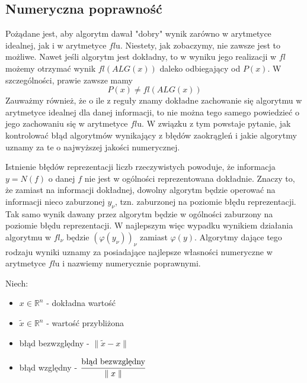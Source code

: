 \documentclass[hidelinks,a4paper,fleqn]{article}
\newcommand{\RR}{\mathbb{R}}
\begin{document}
\subsection{Numeryczna poprawność}

Pożądane jest, aby algorytm dawał "dobry" wynik zarówno w arytmetyce idealnej, jak i w arytmetyce $fl$u. Niestety, jak zobaczymy, nie zawsze jest to możliwe. Nawet jeśli algorytm jest dokładny, to w wyniku jego realizacji w $fl$ możemy otrzymać wynik $fl(ALG(x))$ daleko odbiegający od $P(x)$. W szczególności, prawie zawsze mamy
\[P(x) \neq fl(ALG(x))\]
Zauważmy również, że o ile z reguły znamy dokładne zachowanie się algorytmu w arytmetyce idealnej dla danej informacji, to nie można tego samego powiedzieć o jego zachowaniu się w arytmetyce $fl$u. W związku z tym powstaje pytanie, jak kontrolować błąd algorytmów wynikający z błędów zaokrągleń i jakie algorytmy uznamy za te o najwyższej jakości numerycznej.

Istnienie błędów reprezentacji liczb rzeczywistych powoduje, że informacja $y=N(f)$ o danej $f$ nie jest w ogólności reprezentowana dokładnie. Znaczy to, że zamiast na informacji dokładnej, dowolny algorytm będzie operować na informacji nieco zaburzonej $y_\nu$, tzn. zaburzonej na poziomie błędu reprezentacji. Tak samo wynik dawany przez algorytm będzie w ogólności zaburzony na poziomie błędu reprezentacji. W najlepszym więc wypadku wynikiem działania algorytmu w $fl_\nu$ będzie $(\varphi(y_\nu))_\nu$ zamiast $\varphi(y)$. Algorytmy dające tego rodzaju wyniki uznamy za posiadające najlepsze własności numeryczne w arytmetyce $fl$u i nazwiemy numerycznie poprawnymi.

Niech:
\begin{itemize}
    \item $x \in \RR^n$ - dokładna wartość
    \item $\tilde{x} \in \RR^n$ - wartość przybliżona
    \item błąd bezwzględny - $\parallel \tilde{x} - x \parallel$
    \item błąd względny - $\cfrac{\textrm{błąd bezwzględny}}{\parallel x \parallel}$
\end{itemize}
{\centering {}\par}
\end{document}
